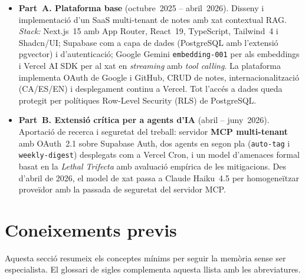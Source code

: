 \begin{itemize}
  \item \textbf{Part~A. Plataforma base} (octubre~2025 -- abril~2026).
    Disseny i implementació d'un SaaS multi-tenant de notes amb xat
    contextual RAG. \emph{Stack:} Next.js~15 amb App Router, React~19,
    TypeScript, Tailwind~4 i Shadcn/UI; Supabase com a capa de dades
    (PostgreSQL amb l'extensió pgvector) i d'autenticació; Google
    Gemini \texttt{embedding-001} per als embeddings i Vercel AI SDK
    per al xat en \emph{streaming} amb \emph{tool calling}. La
    plataforma implementa OAuth de Google i GitHub, CRUD de notes,
    internacionalització (CA/ES/EN) i desplegament continu a Vercel.
    Tot l'accés a dades queda protegit per polítiques Row-Level
    Security (RLS) de PostgreSQL.

  \item \textbf{Part~B. Extensió crítica per a agents d'IA}
    (abril -- juny~2026). Aportació de recerca i seguretat del
    treball: servidor \textbf{MCP multi-tenant} amb OAuth~2.1 sobre
    Supabase Auth, dos agents en segon pla
    (\texttt{auto-tag} i \texttt{weekly-digest}) desplegats com a
    Vercel Cron, i un model d'amenaces formal
    basat en la \emph{Lethal Trifecta}
    \autocite{willison2025trifecta} amb avaluació empírica de les
    mitigacions. Des d'abril de 2026, el model de xat passa a
    Claude Haiku~4.5 per homogeneïtzar proveïdor amb la passada de
    seguretat del servidor MCP.
\end{itemize}

\section{Coneixements previs}
\label{sec:coneixements-previs}

Aquesta secció resumeix els conceptes mínims per seguir la memòria sense
ser especialista. El glossari de sigles complementa aquesta llista amb les
abreviatures.

